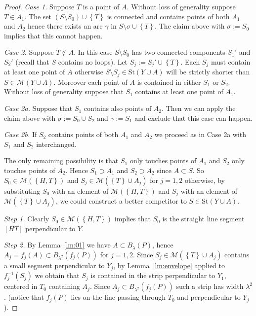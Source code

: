 \documentclass{article}
\newcommand{\ENCLOSE}[1]{\left\{#1\right\}}
\newcommand{\St}{\mathrm{St}}
\newcommand{\M}{\mathcal{M}}
\theoremstyle{definition}
\theoremstyle{remark}
\begin{document}
\begin{proof}
  \emph{Case 1.} 
  Suppose $T$ is a point of $A$.
  Without loss of generality suppose $T\in A_1$.
  The set $(S\setminus S_0)\cup\ENCLOSE{T}$
  is connected and contains points of both $A_1$
  and $A_2$ hence there exists an arc $\gamma$ 
  in $S\setminus \sigma\cup\ENCLOSE{T}$.
  The claim above with $\sigma:=S_0$ implies that this cannot happen.
  
  \emph{Case 2.} Suppose $T\not \in A$.
  In this case $S\setminus S_0$ has two connected components 
  $S_1'$ and $S_2'$ (recall that $S$ contains no loops).
  Let $S_j:=S_j'\cup \ENCLOSE{T}$.
  Each $S_j$ must contain at least one point of $A$ otherwise 
  $S\setminus S_j\in \St(Y\cup A)$ will be 
  strictly shorter than $S\in \M(Y\cup A)$.
  Moreover each point of $A$ is contained in either $S_1$ or $S_2$.
  Without loss of generality suppose that $S_1$ 
  contains at least one point of $A_1$.
  
  \emph{Case 2a.} 
  Suppose that $S_1$ contains also points of $A_2$.
  Then we can apply the claim above with 
  $\sigma:= S_0 \cup S_2$ and 
  $\gamma:= S_1$ and exclude that this case can happen.
  
  \emph{Case 2b.} If $S_2$ contains points of both 
  $A_1$ and $A_2$ we proceed 
  as in Case 2a with $S_1$ and $S_2$ interchanged.
  
  The only remaining possibility is that $S_1$ 
  only touches points of $A_1$ 
  and $S_2$ only touches points of $A_2$. 
  Hence $S_1\supset A_1$ and $S_2\supset A_2$ since $A\subset S$.
  So $S_0\in \M(\ENCLOSE{H,T})$  
  and $S_j \in \M(\ENCLOSE{T} \cup A_j)$ for $j=1,2$
  otherwise, by substituting $S_0$ with an element of $\M(\ENCLOSE{H,T})$
  and $S_j$ with an element of $\M(\ENCLOSE{T}\cup A_j)$,
  we could construct a better competitor 
  to $S\in \St(Y\cup A)$.
  
  \emph{Step 1.} 
  Clearly $S_0\in \M(\ENCLOSE{H,T})$ implies that $S_0$ is the straight 
  line segment $[HT]$ perpendicular to $Y$.
  
  \emph{Step 2.}
  By Lemma~\ref{lm:01} we have $A\subset B_\lambda(P)$,
  hence $A_j = f_j(A) \subset B_{\lambda^2}(f_j(P))$
  for $j=1,2$.
  Since $S_j \in \M(\ENCLOSE{T}\cup A_j)$
  contains a small segment perpendicular to $Y_j$,
  by Lemma~\ref{lm:envelope} applied to $f_j^{-1}(S_j)$
  we obtain that $S_j$ is contained in the strip perpendicular 
  to $Y_1$, centered in $T_0$
  containing $A_j$. 
  Since $A_j\subset B_{\lambda^2}(f_j(P))$
  such a strip has width $\lambda^2$.
  (notice that $f_j(P)$ lies on the line passing through $T_0$ and perpendicular 
  to $Y_j$).
  

\end{proof}
\end{document}
